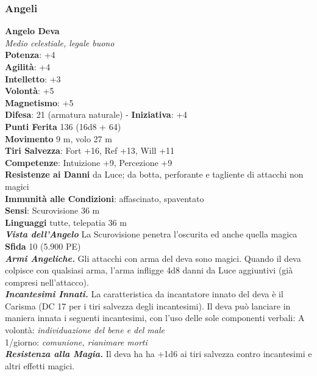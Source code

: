 \begin{multicols}{2}
\subsubsection{Angeli}

\medskip\textbf{Angelo Deva}\\
\emph{Medio celestiale, legale buono}\\
\textbf{Potenza}: +4\\
\textbf{Agilità}: +4\\
\textbf{Intelletto}: +3\\
\textbf{Volontà}: +5\\
\textbf{Magnetismo}: +5\\
\textbf{Difesa}: 21 (armatura naturale) - \textbf{Iniziativa}: +4\\
\textbf{Punti Ferita} 136 (16d8 + 64)\\
\textbf{Movimento} 9 m, volo 27 m\\
\textbf{Tiri Salvezza}: Fort +16, Ref +13, Will +11\\
\textbf{Competenze}: Intuizione +9, Percezione +9\\
\textbf{Resistenze ai Danni} da Luce; da botta, perforante e tagliente di attacchi non magici\\
\textbf{Immunità alle Condizioni}: affascinato, spaventato\\
\textbf{Sensi}: Scurovisione 36 m\\
\textbf{Linguaggi} tutte, telepatia 36 m\\
\emph{\textbf{Vista dell'Angelo}} La Scurovisione penetra l'oscurita ed anche quella magica\\
\textbf{Sfida} 10 (5.900 PE)\smallskip\\
\emph{\textbf{Armi Angeliche.}} Gli attacchi con arma del deva sono magici. Quando il deva colpisce con qualsiasi arma, l'arma infligge 4d8 danni da Luce aggiuntivi (già compresi nell'attacco).\\
\emph{\textbf{Incantesimi Innati.}} La caratteristica da incantatore innato del deva è il Carisma (DC 17 per i tiri salvezza degli incantesimi). Il deva può lanciare in maniera innata i seguenti incantesimi, con l'uso delle sole componenti verbali: 
A volontà: \emph{individuazione del bene e del male}\\
1/giorno: \emph{comunione, rianimare morti}\\
\emph{\textbf{Resistenza alla Magia.}} Il deva ha ha +1d6 ai tiri salvezza contro incantesimi e altri effetti magici.\\

\end{multicols}
